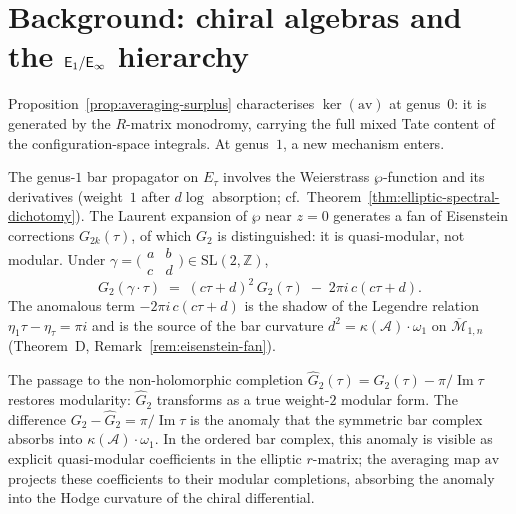 \section{Background: chiral algebras and the $\mathsf{E}_1/\mathsf{E}_{\infty}$
hierarchy}
\label{sec:background}
\begin{remark}
\label{rem:genus1-ker-av}
\ClaimStatusConjectured
Proposition~\ref{prop:averaging-surplus} characterises $\ker(\mathrm{av})$
at genus~$0$: it is generated by the $R$-matrix monodromy, carrying
the full mixed Tate content of the configuration-space integrals.
At genus~$1$, a new mechanism enters.

The genus-$1$ bar propagator on $E_\tau$ involves the Weierstrass
$\wp$-function and its derivatives (weight~$1$ after $d\log$ absorption;
cf.\ Theorem~\ref{thm:elliptic-spectral-dichotomy}). The Laurent
expansion of $\wp$ near $z = 0$ generates a fan of Eisenstein
corrections $G_{2k}(\tau)$, of which $G_2$ is distinguished: it is
quasi-modular, not modular. Under $\gamma = \bigl(\begin{smallmatrix}
a & b \\ c & d \end{smallmatrix}\bigr) \in \mathrm{SL}(2,\mathbb{Z})$,
\[
 G_2(\gamma\cdot\tau)
 \;=\;
 (c\tau + d)^2 \, G_2(\tau)
 \;-\;
 2\pi i\, c(c\tau + d).
\]
The anomalous term $-2\pi i\, c(c\tau + d)$ is the shadow of the
Legendre relation $\eta_1 \tau - \eta_\tau = \pi i$ and is
the source of the bar curvature
$d^2 = \kappa(\mathcal{A})\cdot\omega_1$ on
$\overline{\mathcal{M}}_{1,n}$
(Theorem~D, Remark~\ref{rem:eisenstein-fan}).

The passage to the non-holomorphic completion
$\widehat{G}_2(\tau) = G_2(\tau) - \pi / \operatorname{Im}\tau$
restores modularity: $\widehat{G}_2$ transforms as a true weight-$2$
modular form. The difference $G_2 - \widehat{G}_2 = \pi/\operatorname{Im}\tau$
is the anomaly that the symmetric bar complex absorbs into
$\kappa(\mathcal{A})\cdot\omega_1$. In the ordered bar complex,
this anomaly is visible as explicit quasi-modular coefficients in
the elliptic $r$-matrix; the averaging map $\mathrm{av}$ projects
these coefficients to their modular completions, absorbing the
anomaly into the Hodge curvature of the chiral differential.


\end{remark}
